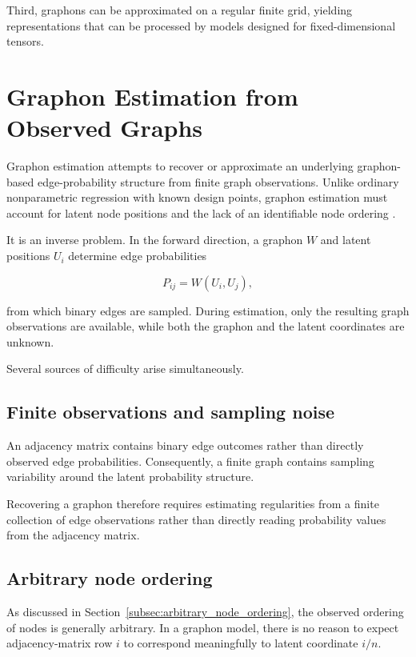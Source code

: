 Third, graphons can be approximated on a regular finite grid, yielding representations that can be processed by models designed for fixed-dimensional tensors.


\section{Graphon Estimation from Observed Graphs}
\label{sec:graphon_estimation}

Graphon estimation attempts to recover or approximate an underlying graphon-based edge-probability structure from finite graph observations. Unlike ordinary nonparametric regression with known design points, graphon estimation must account for latent node positions and the lack of an identifiable node ordering \cite{gao2015rate}.

It is an inverse problem. In the forward direction, a graphon \(W\) and latent positions \(U_i\) determine edge probabilities

\[
P_{ij}=W(U_i,U_j),
\]

from which binary edges are sampled. During estimation, only the resulting graph observations are available, while both the graphon and the latent coordinates are unknown.

Several sources of difficulty arise simultaneously.


\subsection{Finite observations and sampling noise}
\label{subsec:finite_observations_noise}

An adjacency matrix contains binary edge outcomes rather than directly observed edge probabilities. Consequently, a finite graph contains sampling variability around the latent probability structure.

Recovering a graphon therefore requires estimating regularities from a finite collection of edge observations rather than directly reading probability values from the adjacency matrix.


\subsection{Arbitrary node ordering}
\label{subsec:graphon_arbitrary_ordering}

As discussed in Section~\ref{subsec:arbitrary_node_ordering}, the observed ordering of nodes is generally arbitrary. In a graphon model, there is no reason to expect adjacency-matrix row \(i\) to correspond meaningfully to latent coordinate \(i/n\).

